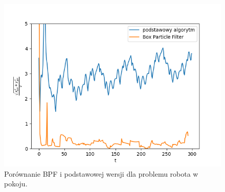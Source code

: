 \begin{figure}[H]
	\begin{center}
		\includegraphics[width=12cm]{./bpf_robot_2d_err.png}
		\caption{Porównanie BPF i podstawowej wersji dla problemu robota w pokoju.}
		\label{bpf_robot_2d_err}
	\end{center}
\end{figure}


